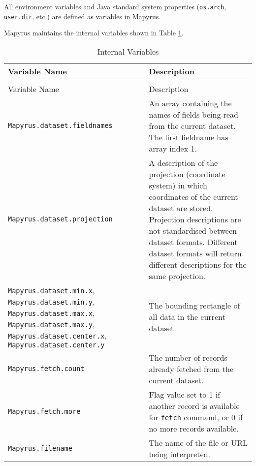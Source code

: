 All environment variables and
Java standard system properties (\texttt{os.arch}, \texttt{user.dir}, etc.)
are defined as variables in Mapyrus.

Mapyrus maintains the internal variables shown in Table \ref{internalvariables}.

\begin{longtable}{|p{6cm}|p{7cm}|}
\hline
\label{internalvariables}
Variable Name & Description \\
\hline
\hline
\endfirsthead
\hline
\caption{Internal Variables} \\
\endfoot

\hline
Variable Name & Description \\
\hline
\hline
\endhead

\texttt{Mapyrus.dataset.fieldnames} &
An array containing the names of fields being read from
the current dataset.  The first fieldname has array index 1. \\

\hline

\texttt{Mapyrus.dataset.projection} &
A description of the projection (coordinate system) in which coordinates
of the current dataset are stored.
Projection descriptions are not standardised between dataset formats.
Different dataset formats will return different descriptions for the same
projection. \\

\hline

\texttt{Mapyrus.dataset.min.x},
\texttt{Mapyrus.dataset.min.y},
\texttt{Mapyrus.dataset.max.x},
\texttt{Mapyrus.dataset.max.y},
\texttt{Mapyrus.dataset.center.x},
\texttt{Mapyrus.dataset.center.y} &
The bounding rectangle of all data in the current dataset. \\

\hline

\texttt{Mapyrus.fetch.count} &
The number of records already fetched from the current dataset. \\

\hline

\texttt{Mapyrus.fetch.more} &
Flag value set to 1 if another record is available
for \texttt{fetch}
command, or 0 if no more records available. \\

\hline

\texttt{Mapyrus.filename} &
The name of the file or URL being interpreted. \\

\hline


\end{longtable}
